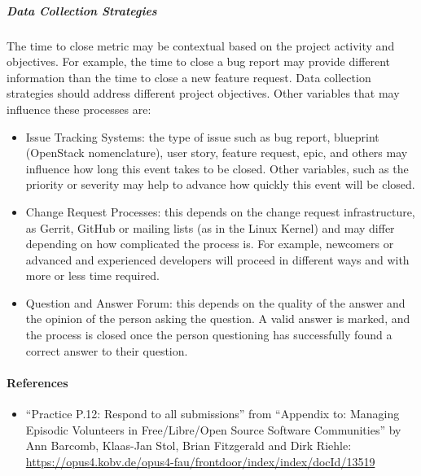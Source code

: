 \hypertarget{data-collection-strategies}{%
\subparagraph{Data Collection
Strategies}\label{data-collection-strategies}}

The time to close metric may be contextual based on the project activity
and objectives. For example, the time to close a bug report may provide
different information than the time to close a new feature request. Data
collection strategies should address different project objectives. Other
variables that may influence these processes are:

\begin{itemize}
\tightlist
\item
  Issue Tracking Systems: the type of issue such as bug report,
  blueprint (OpenStack nomenclature), user story, feature request, epic,
  and others may influence how long this event takes to be closed. Other
  variables, such as the priority or severity may help to advance how
  quickly this event will be closed.
\item
  Change Request Processes: this depends on the change request
  infrastructure, as Gerrit, GitHub or mailing lists (as in the Linux
  Kernel) and may differ depending on how complicated the process is.
  For example, newcomers or advanced and experienced developers will
  proceed in different ways and with more or less time required.
\item
  Question and Answer Forum: this depends on the quality of the answer
  and the opinion of the person asking the question. A valid answer is
  marked, and the process is closed once the person questioning has
  successfully found a correct answer to their question.
\end{itemize}

\hypertarget{references}{%
\paragraph{References}\label{references}}

\begin{itemize}
\tightlist
\item
  ``Practice P.12: Respond to all submissions'' from ``Appendix to:
  Managing Episodic Volunteers in Free/Libre/Open Source Software
  Communities'' by Ann Barcomb, Klaas-Jan Stol, Brian Fitzgerald and
  Dirk Riehle:
  \url{https://opus4.kobv.de/opus4-fau/frontdoor/index/index/docId/13519}
\end{itemize}

